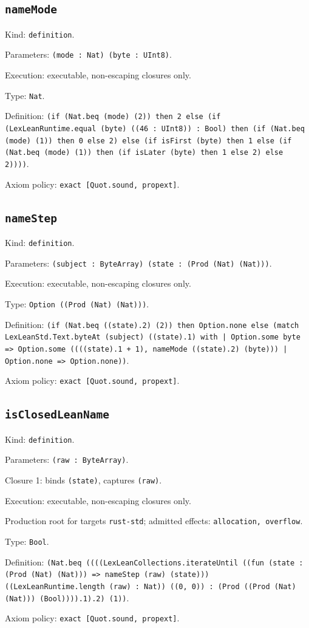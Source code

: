 \documentclass[11pt]{article}
\begin{document}
\subsection*{\texttt{nameMode}}
\noindent Kind: \texttt{definition}.\par
\noindent Parameters: \texttt{(mode : Nat) (byte : UInt8)}.\par
\noindent Execution: executable, non-escaping closures only.\par
\noindent Type: \texttt{Nat}.\par
\noindent Definition: \texttt{(if (Nat.beq (mode) (2)) then 2 else (if (LexLeanRuntime.equal (byte) ((46 : UInt8)) : Bool) then (if (Nat.beq (mode) (1)) then 0 else 2) else (if isFirst (byte) then 1 else (if (Nat.beq (mode) (1)) then (if isLater (byte) then 1 else 2) else 2))))}.\par
\noindent Axiom policy: \texttt{exact [Quot.sound, propext]}.\par
\subsection*{\texttt{nameStep}}
\noindent Kind: \texttt{definition}.\par
\noindent Parameters: \texttt{(subject : ByteArray) (state : (Prod (Nat) (Nat)))}.\par
\noindent Execution: executable, non-escaping closures only.\par
\noindent Type: \texttt{Option ((Prod (Nat) (Nat)))}.\par
\noindent Definition: \texttt{(if (Nat.beq ((state).2) (2)) then Option.none else (match LexLeanStd.Text.byteAt (subject) ((state).1) with | Option.some byte => Option.some ((((state).1 + 1), nameMode ((state).2) (byte))) | Option.none => Option.none))}.\par
\noindent Axiom policy: \texttt{exact [Quot.sound, propext]}.\par
\subsection*{\texttt{isClosedLeanName}}
\noindent Kind: \texttt{definition}.\par
\noindent Parameters: \texttt{(raw : ByteArray)}.\par
\noindent Closure 1: binds \texttt{(state)}, captures \texttt{(raw)}.\par
\noindent Execution: executable, non-escaping closures only.\par
\noindent Production root for targets \texttt{rust-std}; admitted effects: \texttt{allocation, overflow}.\par
\noindent Type: \texttt{Bool}.\par
\noindent Definition: \texttt{(Nat.beq ((((LexLeanCollections.iterateUntil ((fun (state : (Prod (Nat) (Nat))) => nameStep (raw) (state))) ((LexLeanRuntime.length (raw) : Nat)) ((0, 0)) : (Prod ((Prod (Nat) (Nat))) (Bool)))).1).2) (1))}.\par
\noindent Axiom policy: \texttt{exact [Quot.sound, propext]}.\par
\end{document}
